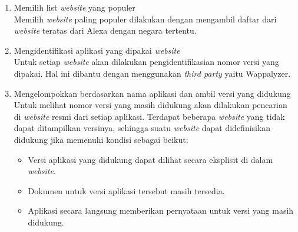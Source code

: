 \begin{enumerate}
    \item Memilih list \textit{website} yang populer\\
    Memilih \textit{website} paling populer dilakukan dengan mengambil daftar dari \textit{website} teratas dari Alexa dengan negara tertentu.
    \item Mengidentifikasi aplikasi yang dipakai \textit{website}\\
    Untuk setiap \textit{website} akan dilakukan pengidentifikasian nomor versi yang dipakai. Hal ini dibantu dengan menggunakan \textit{third party} yaitu Wappalyzer. 
    \item Mengelompokkan berdasarkan nama aplikasi dan ambil versi yang didukung\\
    Untuk melihat nomor versi yang masih didukung akan dilakukan pencarian di \textit{website} resmi dari setiap aplikasi. Terdapat beberapa \textit{website} yang tidak dapat ditampilkan versinya, sehingga suatu \textit{website} dapat didefinisikan didukung jika memenuhi kondisi sebagai beikut:
    \begin{itemize}
        \item Versi aplikasi yang didukung dapat dilihat secara eksplisit di dalam \textit{website}.
        \item Dokumen untuk versi aplikasi tersebut masih tersedia.
        \item Aplikasi secara langsung memberikan pernyataan untuk versi yang masih didukung.
    \end{itemize}
    

\end{enumerate}
